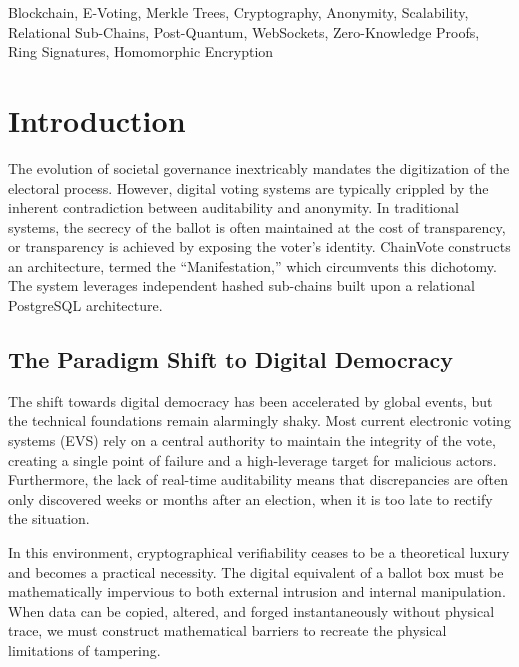 \documentclass[journal,10pt,twocolumn]{IEEEtran}
\begin{document}
\begin{IEEEkeywords}
Blockchain, E-Voting, Merkle Trees, Cryptography, Anonymity, Scalability, Relational Sub-Chains, Post-Quantum, WebSockets, Zero-Knowledge Proofs, Ring Signatures, Homomorphic Encryption
\end{IEEEkeywords}

\section{Introduction}

The evolution of societal governance inextricably mandates the digitization of the electoral process. However, digital voting systems are typically crippled by the inherent contradiction between auditability and anonymity. In traditional systems, the secrecy of the ballot is often maintained at the cost of transparency, or transparency is achieved by exposing the voter's identity. ChainVote constructs an architecture, termed the ``Manifestation,'' which circumvents this dichotomy. The system leverages independent hashed sub-chains built upon a relational PostgreSQL architecture.

\subsection{The Paradigm Shift to Digital Democracy}

The shift towards digital democracy has been accelerated by global events, but the technical foundations remain alarmingly shaky. Most current electronic voting systems (EVS) rely on a central authority to maintain the integrity of the vote, creating a single point of failure and a high-leverage target for malicious actors. Furthermore, the lack of real-time auditability means that discrepancies are often only discovered weeks or months after an election, when it is too late to rectify the situation.

In this environment, cryptographical verifiability ceases to be a theoretical luxury and becomes a practical necessity. The digital equivalent of a ballot box must be mathematically impervious to both external intrusion and internal manipulation. When data can be copied, altered, and forged instantaneously without physical trace, we must construct mathematical barriers to recreate the physical limitations of tampering.
\end{document}

